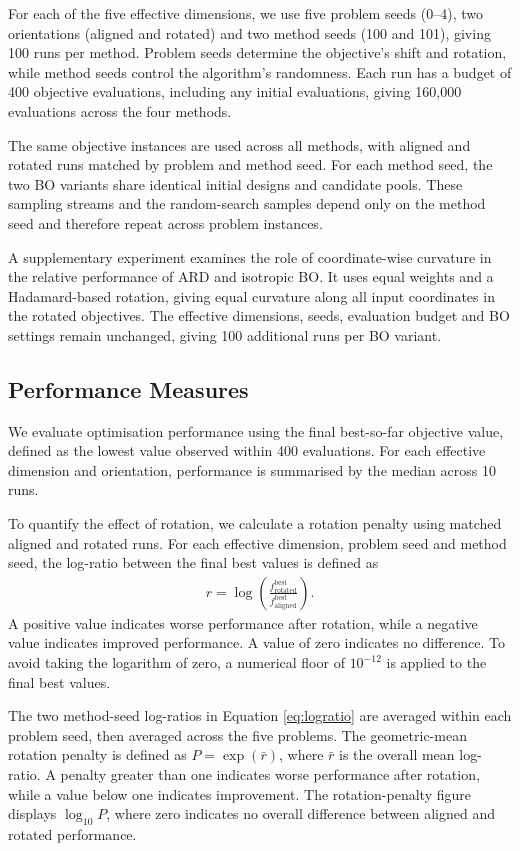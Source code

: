 \documentclass[11pt]{article}
\begin{document}
For each of the five effective dimensions, we use five problem seeds (0--4), two orientations (aligned and rotated) and two method seeds (100 and 101), giving 100 runs per method. Problem seeds determine the objective's shift and rotation, while method seeds control the algorithm's randomness. Each run has a budget of 400 objective evaluations, including any initial evaluations, giving 160,000 evaluations across the four methods.

The same objective instances are used across all methods, with aligned and rotated runs matched by problem and method seed. For each method seed, the two BO variants share identical initial designs and candidate pools. These sampling streams and the random-search samples depend only on the method seed and therefore repeat across problem instances.

A supplementary experiment examines the role of coordinate-wise curvature in the relative performance of ARD and isotropic BO. It uses equal weights and a Hadamard-based rotation, giving equal curvature along all input coordinates in the rotated objectives. The effective dimensions, seeds, evaluation budget and BO settings remain unchanged, giving 100 additional runs per BO variant.

\subsection{Performance Measures}

We evaluate optimisation performance using the final best-so-far objective value, defined as the lowest value observed within 400 evaluations. For each effective dimension and orientation, performance is summarised by the median across 10 runs.

To quantify the effect of rotation, we calculate a rotation penalty using matched aligned and rotated runs. For each effective dimension, problem seed and method seed, the log-ratio between the final best values is defined as
\begin{align}
\label{eq:logratio}
r=\log\!\left(\frac{f_{\mathrm{rotated}}^{\mathrm{best}}}{f_{\mathrm{aligned}}^{\mathrm{best}}}\right).
\end{align}
A positive value indicates worse performance after rotation, while a negative value indicates improved performance. A value of zero indicates no difference. To avoid taking the logarithm of zero, a numerical floor of $10^{-12}$ is applied to the final best values.

The two method-seed log-ratios in Equation \eqref{eq:logratio} are averaged within each problem seed, then averaged across the five problems. The geometric-mean rotation penalty is defined as $P = \exp(\bar r)$, where $\bar r$ is the overall mean log-ratio. A penalty greater than one indicates worse performance after rotation, while a value below one indicates improvement. The rotation-penalty figure displays $\log_{10}P$, where zero indicates no overall difference between aligned and rotated performance.
\end{document}
